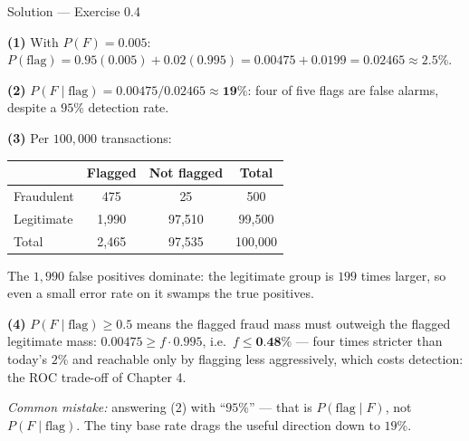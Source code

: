 \documentclass[aspectratio=169,11pt]{beamer}
\begin{document}
\begin{frame}{Solution --- Exercise 0.4}
  \begin{solutionbox}
    \scriptsize
    \textbf{(1)} With $P(F) = 0.005$:
    $P(\text{flag}) = 0.95(0.005) + 0.02(0.995)
    = 0.00475 + 0.0199 = 0.02465 \approx 2.5\%$.

    \textbf{(2)} $P(F \mid \text{flag}) = 0.00475/0.02465 \approx
    \textbf{19\%}$: four of five flags are false alarms, despite a $95\%$
    detection rate.

    \textbf{(3)} Per $100{,}000$ transactions:
    \begin{center}\scriptsize
    \begin{tabular}{@{}lccc@{}}
      \toprule
       & \textbf{Flagged} & \textbf{Not flagged} & \textbf{Total} \\
      \midrule
      Fraudulent & 475 & 25 & 500 \\
      Legitimate & 1{,}990 & 97{,}510 & 99{,}500 \\
      \midrule
      Total & 2{,}465 & 97{,}535 & 100{,}000 \\
      \bottomrule
    \end{tabular}
    \end{center}
    The $1{,}990$ false positives dominate: the legitimate group is $199$
    times larger, so even a small error rate on it swamps the true positives.

    \textbf{(4)} $P(F \mid \text{flag}) \ge 0.5$ means the flagged fraud
    mass must outweigh the flagged legitimate mass:
    $0.00475 \ge f \cdot 0.995$, i.e.\ $f \le \textbf{0.48\%}$ --- four
    times stricter than today's $2\%$ and reachable only by flagging less
    aggressively, which costs detection: the ROC trade-off of Chapter 4.

    \smallskip
    \textit{Common mistake:} answering (2) with ``$95\%$'' --- that is
    $P(\text{flag} \mid F)$, not $P(F \mid \text{flag})$. The tiny base
    rate drags the useful direction down to $19\%$.
  \end{solutionbox}
\end{frame}
\end{document}
